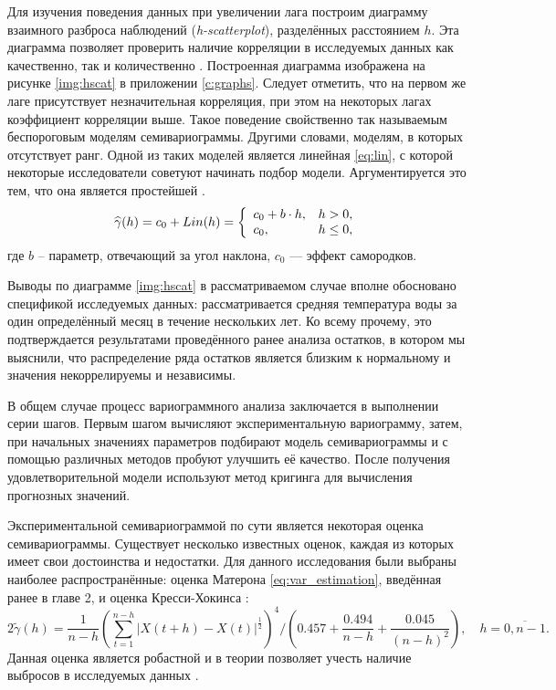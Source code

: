 Для изучения поведения данных при увеличении лага построим диаграмму взаимного разброса наблюдений (\textit{h-scatterplot}), разделённых расстоянием $ h $. Эта диаграмма позволяет проверить наличие корреляции в исследуемых данных как качественно, так и количественно \cite{saveliev2012}. Построенная диаграмма изображена на рисунке \ref{img:hscat} в приложении \ref{c:graphs}. Следует отметить, что на первом же лаге присутствует незначительная корреляция, при этом на некоторых лагах коэффициент корреляции выше. Такое поведение свойственно так называемым беспороговым моделям семивариограммы. Другими словами, моделям, в которых отсутствует ранг. Одной из таких моделей является линейная \eqref{eq:lin}, с которой некоторые исследователи советуют начинать подбор модели. Аргументируется это тем, что она является простейшей \cite{saveliev2012}.
\begin{equation}
\label{eq:lin}
	\widehat{\gamma}(h) = c_0 + Lin(h) = \left\{
 \begin{array}{l l}
   c_0 + b \cdot h, & h > 0, \\
   c_0, & h \leq 0,
 \end{array} \right.
\end{equation}
где $ b $ -- параметр, отвечающий за угол наклона, $ c_0 $ --- эффект самородков.

Выводы по диаграмме \ref{img:hscat} в рассматриваемом случае вполне обосновано спецификой исследуемых данных: рассматривается средняя температура воды за один определённый месяц в течение нескольких лет. Ко всему прочему, это подтверждается результатами проведённого ранее анализа остатков, в котором мы выяснили, что распределение ряда остатков является близким к нормальному и значения некоррелируемы и независимы.

В общем случае процесс вариограммного анализа заключается в выполнении серии шагов. Первым шагом вычисляют экспериментальную вариограмму, затем, при начальных значениях параметров подбирают модель семивариограммы и с помощью различных методов пробуют улучшить её качество. После получения удовлетворительной модели используют метод кригинга для вычисления прогнозных значений.

Экспериментальной семивариограммой по сути является некоторая оценка семивариограммы. Существует несколько известных оценок, каждая из которых имеет свои достоинства и недостатки. Для данного исследования были выбраны наиболее распространённые: оценка Матерона \eqref{eq:var_estimation}, введённая ранее в главе 2, и оценка Кресси-Хокинса \cite{cressie1993statistics, dutter}:
\begin{equation}
\label{eq:cressie}
	2 \tilde{\gamma}(h) = \frac{1}{n - h} (\sum_{t = 1}^{n - h} | X(t + h) - X(t) |^{\frac{1}{2}} )^4 / (0.457 + \frac{0.494}{n - h} + \frac{0.045}{(n - h)^2}), \quad h = \overline{0, n - 1}.
\end{equation}
Данная оценка является робастной и в теории позволяет учесть наличие выбросов в исследуемых данных \cite{MINGOTI2008}.

